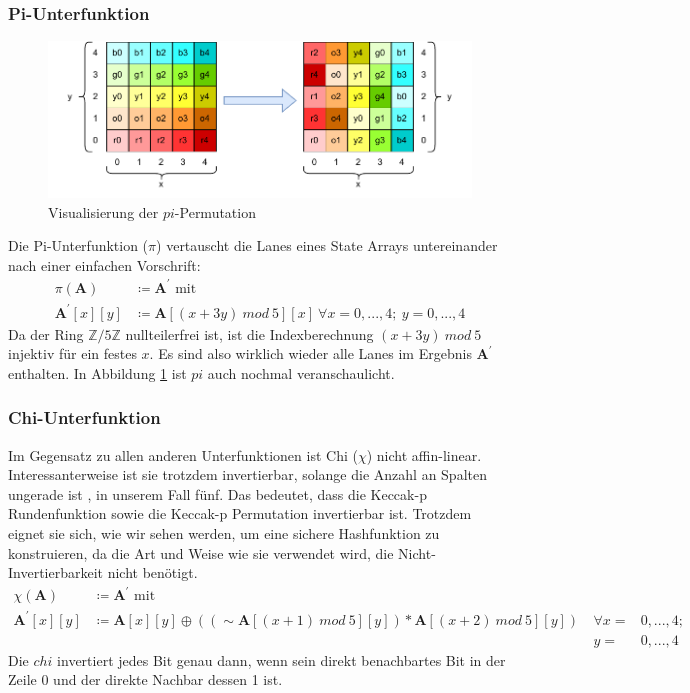 \subsubsection{Pi-Unterfunktion}
\begin{figure}
    \center
    \includegraphics{images/pi.pdf}
    \caption{Visualisierung der $pi$-Permutation}
    \label{fig:definition_pi}
\end{figure}
Die Pi-Unterfunktion ($\pi$) vertauscht die Lanes eines State Arrays untereinander nach einer einfachen Vorschrift:
\begin{align*}
    \pi (\textbf{A}) & \coloneq \textbf{A}^\prime \text{ mit } \\
    \textbf{A}^\prime[x][y] & \coloneq \textbf{A}[(x + 3y)\ mod\ 5][x]\ \forall x = 0,...,4;\ y = 0,...,4
\end{align*}
Da der Ring $\mathbb{Z}/5\mathbb{Z}$ nullteilerfrei ist, ist die Indexberechnung $(x + 3y)\ mod\ 5$ injektiv für ein festes $x$.
Es sind also wirklich wieder alle Lanes im Ergebnis $\textbf{A}^\prime$ enthalten. In Abbildung \ref{fig:definition_pi} ist $pi$
auch nochmal veranschaulicht.

\subsubsection{Chi-Unterfunktion}
Im Gegensatz zu allen anderen Unterfunktionen ist Chi ($\chi$) nicht affin-linear.
Interessanterweise ist sie trotzdem invertierbar, solange die Anzahl an Spalten ungerade ist \cite{Daemen1995CipherAH}, in unserem Fall fünf. 
Das bedeutet, dass die Keccak-p Rundenfunktion sowie die Keccak-p Permutation invertierbar ist.
Trotzdem eignet sie sich, wie wir sehen werden, um eine sichere Hashfunktion zu konstruieren,
da die Art und Weise wie sie verwendet wird, die Nicht-Invertierbarkeit nicht benötigt.
\begin{align*}
    \chi (\textbf{A}) & \coloneq \textbf{A}^\prime \text{ mit } \\
    \textbf{A}^\prime[x][y] & \coloneq \textbf{A}[x][y] \oplus ((\sim \textbf{A}[(x + 1)\ mod\ 5][y]) * \textbf{A}[(x + 2)\ mod\ 5][y])\ & \forall x = & 0,...,4;\\
    && y = & 0,...,4
\end{align*}
Die $chi$ invertiert jedes Bit genau dann, wenn sein direkt benachbartes Bit in der Zeile 0 und der direkte Nachbar dessen 1 ist.


